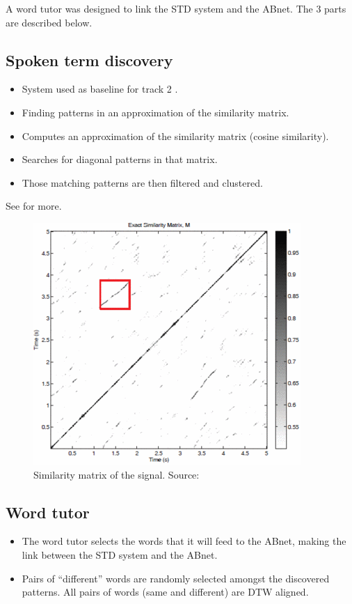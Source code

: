 \documentclass[final]{beamer}
\newcommand{\abnet}{{\sc ABnet}}
\begin{document}
\begin{frame}[t]
\begin{multicols}{3}
A word tutor was designed to link the STD system and the \abnet{}. The 3 parts are described below.


\subsection{Spoken term discovery}

\begin{itemize}
\item System used as baseline for track 2 \cite{versteeghetal2015}.
\item Finding patterns in an approximation of the similarity matrix.
\item Computes an approximation of the similarity matrix (cosine similarity).
\item Searches for diagonal patterns in that matrix.
\item Those matching patterns are then filtered and clustered.
\end{itemize}

See \cite{jansenvandurme2011} for more.

\begin{figure}[ht!]
  \begin{center}
    \includegraphics[width=0.4\columnwidth]{similarity_matrix}
    \caption{\label{fig:system}Similarity matrix of the signal. Source: \cite{jansenvandurme2011}}
  \end{center}
\end{figure}

\subsection{Word tutor}

\begin{itemize}
\item The word tutor selects the words that it will feed to the \abnet{}, making the link between the STD system and the \abnet{}.
\item Pairs of ``different'' words are randomly selected amongst the discovered patterns. All pairs of words (same and different) are DTW aligned.


\end{itemize}
\end{multicols}
\end{frame}
\end{document}
